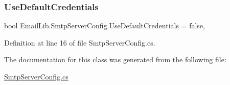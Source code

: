\subsubsection{\texorpdfstring{UseDefaultCredentials}{UseDefaultCredentials}}
{\footnotesize\ttfamily bool Email\+Lib.\+Smtp\+Server\+Config.\+Use\+Default\+Credentials = false\hspace{0.3cm}{\ttfamily [get]}, {\ttfamily [set]}}



Definition at line 16 of file Smtp\+Server\+Config.\+cs.



The documentation for this class was generated from the following file\+:\begin{DoxyCompactItemize}
\item 
\mbox{\hyperlink{SmtpServerConfig_8cs}{Smtp\+Server\+Config.\+cs}}\end{DoxyCompactItemize}
